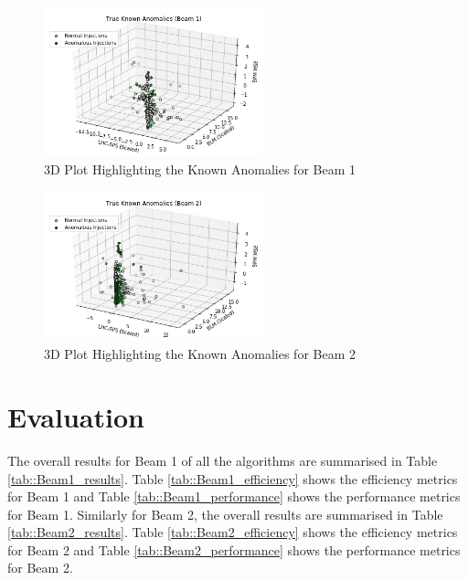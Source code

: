 \documentclass[conference, a4paper]{IEEEtran}
\begin{document}
	\begin{figure}[!t]
		\centering
		\includegraphics[width=2.5in]{TrueAnomalies}
		\caption[True Anomalous Injections (Beam 1)]{3D Plot Highlighting the Known Anomalies for Beam 1}
		\label{fig::TrueAnomalies}
	\end{figure}
	
	\begin{figure}[!t]
		\centering
		\includegraphics[width=2.5in]{Beam2_TrueAnomalies}
		\caption[True Anomalous Injections (Beam 2)]{3D Plot Highlighting the Known Anomalies for  Beam 2}
		\label{fig::TrueAnomalies2}
	\end{figure} 
	
	\section{Evaluation}
	\par The overall results for Beam 1 of all the algorithms are summarised in Table \ref{tab::Beam1_results}. Table \ref{tab::Beam1_efficiency} shows the efficiency metrics for Beam 1 and Table \ref{tab::Beam1_performance} shows the performance metrics for Beam 1. Similarly for Beam 2, the overall results are summarised in Table \ref{tab::Beam2_results}. Table \ref{tab::Beam2_efficiency} shows the efficiency metrics for Beam 2 and Table \ref{tab::Beam2_performance} shows the performance metrics for Beam 2.
	
\end{document}
